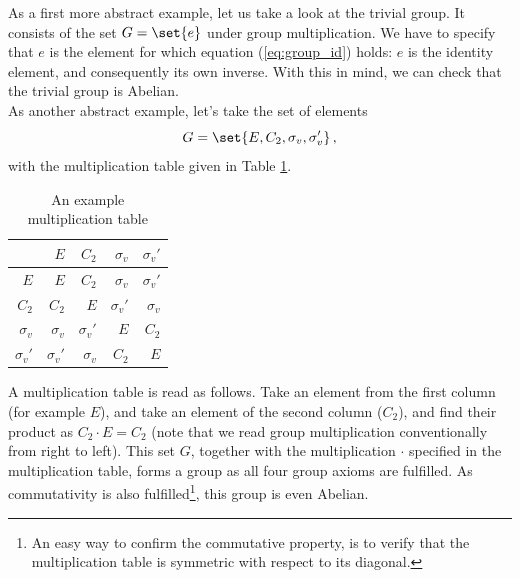             As a first more abstract example, let us take a look at the trivial group. It consists of the set $G = \set{e}$ under group multiplication. We have to specify that $e$ is the element for which equation (\ref{eq:group_id}) holds: $e$ is the identity element, and consequently its own inverse. With this in mind, we can check that the trivial group is Abelian. \\

            As another abstract example, let's take the set of elements
            \begin{equation}
                G = \set{E, C_2, \sigma_v, \sigma_v'} \thinspace ,
            \end{equation}
            with the multiplication table given in Table \ref{table:multiplication_table_C2v}.
            \begin{table}[H] \centering
                \begin{tabular}{r|rrrr}
                                & $E$           & $C_2$         & $\sigma_v$    & $\sigma_v'$   \\ \hline

                    $E$         & $E$           & $C_2$         & $\sigma_v$    & $\sigma_v'$   \\
                    $C_2$       & $C_2$         & $E$           & $\sigma_v'$   & $\sigma_v$    \\
                    $\sigma_v$  & $\sigma_v$    & $\sigma_v'$   & $E$           & $C_2$         \\
                    $\sigma_v'$ & $\sigma_v'$   & $\sigma_v$    & $C_2$         & $E$
                \end{tabular}
                \caption{An example multiplication table}
                \label{table:multiplication_table_C2v}
            \end{table}
            A multiplication table is read as follows. Take an element from the first column (for example $E$), and take an element of the second column ($C_2$), and find their product as $C_2 \cdot E = C_2$ (note that we read group multiplication conventionally from right to left). This set $G$, together with the multiplication $\cdot$ specified in the multiplication table, forms a group as all four group axioms are fulfilled. As commutativity is also fulfilled\footnote{An easy way to confirm the commutative property, is to verify that the multiplication table is symmetric with respect to its diagonal.}, this group is even Abelian. \\

